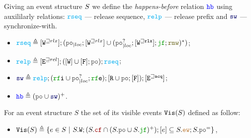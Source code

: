 \documentclass[12pt]{article}
\begin{document}
\begin{definition}
  Giving an event structure $S$ we define the \emph{happens-before} relation $\lHB$
  using auxililarly relations: 
  $\lRSEQ$ --- release sequence,
  $\lRELP$ --- release prefix and
  $\lSW$ --- synchronize-with.
  \begin{itemize}
  \item $\lRSEQ \defeq [\lWsqeq{rlx}];(\lmakeLoc{\lPO};[\lWsqeq{rlx}] \cup 
    (\lmakeLoc{\lPO^?};[\lWsqeq{\rlx}];\lJF;\lRMW)^*)$;
  \item $\lRELP \defeq [\lEsqeq{rel}];([\lW] \cup [\lF];\lPO);\lRSEQ$;
  \item $\lSW \defeq \lRELP; (\lRFI \cup \lmakeLoc{\lPO^?};\lRFE); [\lR \cup \lPO;[\lF]);[\lEsqeq{\acq}]$;
  \item $\lHB \defeq (\lPO \cup \lSW)^+$.
  \end{itemize}
\end{definition}


\begin{definition}
  For an event structure $S$ the set of its visible events ${\mathtt{Vis}}(S)$ defined as follow:
  \begin{itemize}
    \item $\lVIS(S) \defeq 
      \{ e \in S ~|~ S.\lW;(S.\lCF \cap (S.\lPO \cup S.\lJF)^+);[e] \subseteq 
         S.\lEW;S.\lPO^=
      \}$,
  \end{itemize}
\end{definition}
\end{document}

